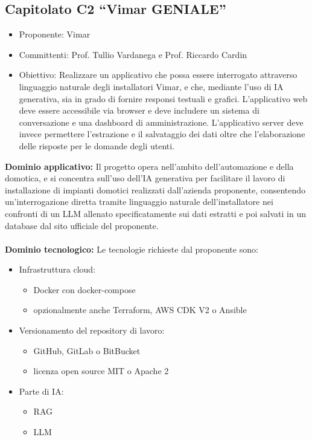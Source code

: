 \documentclass[10pt]{article}
\begin{document}
\subsection{Capitolato C2 “Vimar GENIALE”}
\begin{itemize}
    \item Proponente: Vimar
    \item Committenti: Prof. Tullio Vardanega e Prof. Riccardo Cardin
    \item Obiettivo: Realizzare un applicativo che possa essere interrogato attraverso linguaggio naturale degli installatori Vimar, e che, mediante l’uso di IA generativa, sia in grado di fornire responsi testuali e grafici. L’applicativo web deve essere accessibile via browser e deve includere un sistema di conversazione e una dashboard di amministrazione. L’applicativo server deve invece permettere l’estrazione e il salvataggio dei dati oltre che l’elaborazione delle risposte per le domande degli utenti.
\end{itemize}
\textbf{Dominio applicativo:}
Il progetto opera nell’ambito dell’automazione e della domotica, e si concentra sull’uso dell’IA generativa per facilitare il lavoro di installazione di impianti domotici realizzati dall’azienda proponente, consentendo un’interrogazione diretta tramite linguaggio naturale dell'installatore nei confronti di un LLM allenato specificatamente sui dati estratti e poi salvati in un database dal sito ufficiale del proponente.\\
\\
\textbf{Dominio tecnologico:}
Le tecnologie richieste dal proponente sono:
\begin{itemize}
    \item Infrastruttura cloud:
    \begin{itemize}
        \item Docker con docker-compose
        \item opzionalmente anche Terraform, AWS CDK V2 o Ansible
    \end{itemize}
    \item Versionamento del repository di lavoro:
    \begin{itemize}
        \item GitHub, GitLab o BitBucket
        \item licenza open source MIT o Apache 2
    \end{itemize}
    \item Parte di IA:
    \begin{itemize}
        \item RAG
        \item LLM
    \end{itemize}
\end{itemize}
\end{document}
